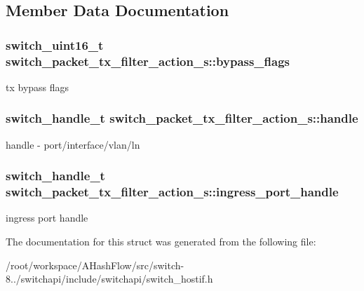 \subsection{Member Data Documentation}
\hypertarget{structswitch__packet__tx__filter__action__s_aaa8962d59a27c28125348cf3bff0a21b}{
\subsubsection[{bypass\+\_\+flags}]{\setlength{\rightskip}{0pt plus 5cm}switch\+\_\+uint16\+\_\+t switch\+\_\+packet\+\_\+tx\+\_\+filter\+\_\+action\+\_\+s\+::bypass\+\_\+flags}}\label{structswitch__packet__tx__filter__action__s_aaa8962d59a27c28125348cf3bff0a21b}
tx bypass flags \hypertarget{structswitch__packet__tx__filter__action__s_a27412d0f230b1989a90a28a2c136cc43}{
\subsubsection[{handle}]{\setlength{\rightskip}{0pt plus 5cm}switch\+\_\+handle\+\_\+t switch\+\_\+packet\+\_\+tx\+\_\+filter\+\_\+action\+\_\+s\+::handle}}\label{structswitch__packet__tx__filter__action__s_a27412d0f230b1989a90a28a2c136cc43}
handle -\/ port/interface/vlan/ln \hypertarget{structswitch__packet__tx__filter__action__s_aa412320d344a4f8f5ab0272972c54167}{
\subsubsection[{ingress\+\_\+port\+\_\+handle}]{\setlength{\rightskip}{0pt plus 5cm}switch\+\_\+handle\+\_\+t switch\+\_\+packet\+\_\+tx\+\_\+filter\+\_\+action\+\_\+s\+::ingress\+\_\+port\+\_\+handle}}\label{structswitch__packet__tx__filter__action__s_aa412320d344a4f8f5ab0272972c54167}
ingress port handle 

The documentation for this struct was generated from the following file\+:\begin{DoxyCompactItemize}
\item 
/root/workspace/\+A\+Hash\+Flow/src/switch-\/8../switchapi/include/switchapi/switch\+\_\+hostif.\+h\end{DoxyCompactItemize}
